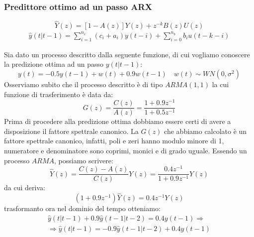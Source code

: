 \subsubsection{Predittore ottimo ad un passo ARX}
  \[ \hat{Y}(z)=[1-A(z)]Y(z)+z^{-k}B(z)U(z) \]
  \[ 
    \begin{split}
      \hat{y}(t|t-1)=\sum_{i=1}^{n_c}{(c_i+a_i)y(t-i)}+\sum_{i=0}^{n_b}{b_iu(t-k-i)}
    \end{split}
   \]
\begin{esempio}
Sia dato un processo descritto dalla seguente funzione, di cui vogliamo conoscere la predizione ottima ad un passo $y(t|t-1)$:
  \[y(t)=-0.5y(t-1)+w(t)+0.9w(t-1) \quad w(t)\sim WN(0,\sigma^2)\]
Osserviamo subito che il processo descritto è di tipo $ARMA(1,1)$ la cui funzione di trasferimento è data da:
  \[G(z)=\frac{C(z)}{A(z)}=\frac{1+0.9z^{-1}}{1+0.5z^{-1}}\]
Prima di procedere alla predizione ottima dobbiamo essere certi di avere a disposizione il fattore spettrale canonico. La $G(z)$ che abbiamo calcolato è un fattore spettrale canonico, infatti, poli e zeri hanno modulo minore di 1, numeratore e denominatore sono coprimi, monici e di grado uguale. Essendo un processo $ARMA$, possiamo scrivere:
  \[\hat{Y}(z)=\frac{C(z)-A(z)}{C(z)}Y(z)=\frac{0.4z^{-1}}{1+0.9z^{-1}}Y(z)\]
da cui deriva:
  \[(1+0.9z^{-1})\hat{Y}(z)=0.4z^{-1}Y(z)\]
trasformanto ora nel dominio del tempo otteniamo:
  \[
    \begin{split}
      \hat{y}(t|t-1)+0.9\hat{y}(t-1|t-2)=0.4y(t-1) \Longrightarrow \\
      \Longrightarrow \hat{y}(t|t-1)=-0.9\hat{y}(t-1|t-2)+0.4y(t-1) 
    \end{split}
  \]
\end{esempio}
